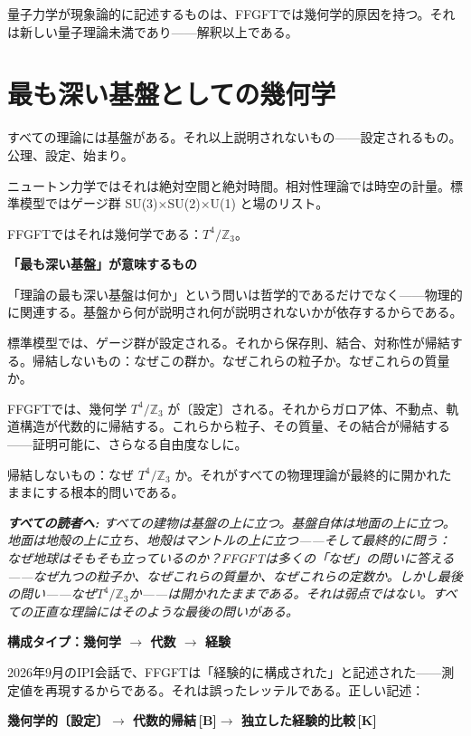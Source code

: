 \documentclass[11pt,openany]{book}
\newcommand{\status}[1]{\penalty10000\,{\tiny\textcolor{gray!70}{[#1]}}}
\newenvironment{laierspur}{%
  \par\vspace{4pt}%
  \noindent\small\itshape\color{blue!60!black}%
  \textbf{すべての読者へ:}\enspace\ignorespaces}{%
  \par\vspace{4pt}\normalsize\normalfont\normalcolor}
\begin{document}
量子力学が現象論的に記述するものは、FFGFTでは幾何学的原因を持つ。それは新しい量子理論未満であり——解釈以上である。

\medskip

\chapter{最も深い基盤としての幾何学}

すべての理論には基盤がある。それ以上説明されないもの——設定されるもの。公理、設定、始まり。

ニュートン力学ではそれは絶対空間と絶対時間。相対性理論では時空の計量。標準模型ではゲージ群 SU(3)×SU(2)×U(1) と場のリスト。

FFGFTではそれは幾何学である：$T^4/\mathbb{Z}_3$。

\textbf{「最も深い基盤」が意味するもの}

「理論の最も深い基盤は何か」という問いは哲学的であるだけでなく——物理的に関連する。基盤から何が説明され何が説明されないかが依存するからである。

標準模型では、ゲージ群が設定される。それから保存則、結合、対称性が帰結する。帰結しないもの：なぜこの群か。なぜこれらの粒子か。なぜこれらの質量か。

FFGFTでは、幾何学 $T^4/\mathbb{Z}_3$ が〔設定〕される。それからガロア体、不動点、軌道構造が代数的に帰結する。これらから粒子、その質量、その結合が帰結する——証明可能に、さらなる自由度なしに。

帰結しないもの：なぜ $T^4/\mathbb{Z}_3$ か。それがすべての物理理論が最終的に開かれたままにする根本的問いである。

\begin{laierspur}
すべての建物は基盤の上に立つ。基盤自体は地面の上に立つ。地面は地殻の上に立ち、地殻はマントルの上に立つ——そして最終的に問う：なぜ地球はそもそも立っているのか？FFGFTは多くの「なぜ」の問いに答える——なぜ九つの粒子か、なぜこれらの質量か、なぜこれらの定数か。しかし最後の問い——なぜ$T^4/\mathbb{Z}_3$か——は開かれたままである。それは弱点ではない。すべての正直な理論にはそのような最後の問いがある。
\end{laierspur}

\textbf{構成タイプ：幾何学 $\to$ 代数 $\to$ 経験}

2026年9月のIPI会話で、FFGFTは「経験的に構成された」と記述された——測定値を再現するからである。それは誤ったレッテルである。正しい記述：

\textbf{幾何学的〔設定〕$\to$ 代数的帰結\status{B}$\to$ 独立した経験的比較\status{K}}
\end{document}
